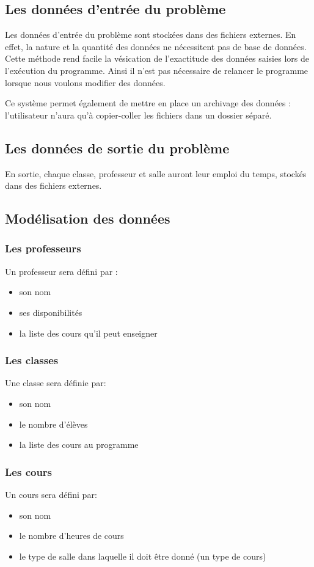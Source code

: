 \documentclass[12pt,a4paper,french]{article}
\begin{document}
\subsection{Les données d'entrée du problème}
Les données d'entrée du problème sont stockées dans des fichiers externes. En effet, la nature et la quantité des données ne nécessitent pas de base de données. Cette méthode rend facile la vésication de l'exactitude des données saisies lors de l'exécution du programme. Ainsi il n'est pas nécessaire de relancer le programme lorsque nous voulons modifier des données.

Ce système permet également de mettre en place un archivage des données : l'utilisateur n'aura qu'à copier-coller les fichiers dans un dossier séparé.

\subsection{Les données de sortie du problème}
En sortie, chaque classe, professeur et salle auront leur emploi du temps, stockés dans des fichiers externes.

\subsection{Modélisation des données}
\subsubsection{Les professeurs}
Un professeur sera défini par :
\begin{itemize}
\item son nom
\item ses disponibilités
\item la liste des cours qu'il peut enseigner
\end{itemize}

\subsubsection{Les classes}
Une classe sera définie par:
\begin{itemize}
\item son nom
\item le nombre d'élèves
\item la liste des cours au programme
\end{itemize}

\subsubsection{Les cours}
Un cours sera défini par:
\begin{itemize}
\item son nom
\item le nombre d'heures de cours
\item le type de salle dans laquelle il doit être donné (un type de cours)
\end{itemize}
\end{document}
